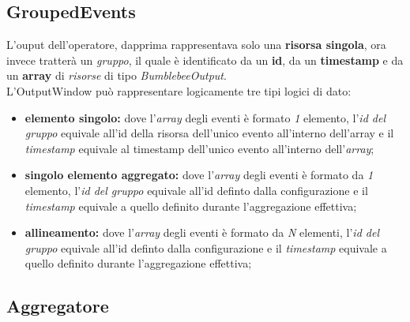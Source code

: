 \subsection{GroupedEvents}\label{sec:ge}
L'ouput dell'operatore, dapprima rappresentava solo una \textbf{risorsa singola}, ora invece tratterà un \textit{gruppo}, il quale è identificato da un \textbf{id}, da un \textbf{\gls{timestamp}} e da un \textbf{array} di \textit{risorse} di tipo \textit{BumblebeeOutput}.\\
L'OutputWindow può rappresentare logicamente tre tipi logici di dato:
\begin{itemize}
	\item{\textbf{elemento singolo:} dove l'\textit{array} degli eventi è formato \textit{1} elemento, l'\textit{id del gruppo} equivale all'id della risorsa dell'unico evento all'interno dell'array e il \textit{\gls{timestamp}} equivale al \gls{timestamp} dell'unico evento all'interno dell'\textit{array};}
	\item{\textbf{singolo elemento aggregato:} dove l'\textit{array} degli eventi è formato da \textit{1} elemento, l'\textit{id del gruppo} equivale all'id definto dalla configurazione e il \textit{\gls{timestamp}} equivale a quello definito durante l'aggregazione effettiva;}
	\item{\textbf{allineamento:} dove l'\textit{array} degli eventi è formato da \textit{N} elementi, l'\textit{id del gruppo} equivale all'id definto dalla configurazione e il \textit{\gls{timestamp}} equivale a quello definito durante l'aggregazione effettiva;}
\end{itemize}

\subsection{Aggregatore}\label{sec:aggregator}




